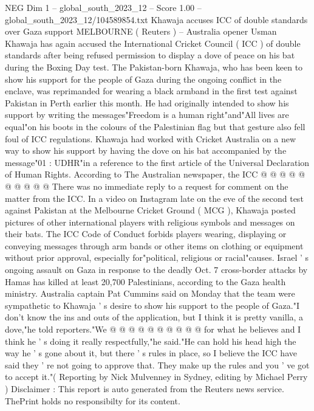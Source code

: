 \begin{textsample}{NEG Dim 1 – global\_south\_2023\_12 – Score 1.00 – global\_south\_2023\_12/104589854.txt}  \label{ex:f1_neg_295}
Khawaja accuses ICC of double standards over Gaza support MELBOURNE ( Reuters ) -- Australia opener Usman Khawaja has again accused the International Cricket Council ( ICC ) of double standards after being refused permission to display a dove of peace on his bat during the Boxing Day test.
The Pakistan-born Khawaja, who has been keen to show his support for the people of Gaza during the ongoing conflict in the enclave, was reprimanded for wearing a black armband in the first test against Pakistan in Perth earlier this month.
He had originally intended to show his support by writing the messages"Freedom is a human right"and"All lives are equal"on his boots in the colours of the Palestinian flag but that gesture also fell foul of ICC regulations.
Khawaja had worked with Cricket Australia on a new way to show his support by having the dove on his bat accompanied by the message"01 : UDHR"in a reference to the first article of the Universal Declaration of Human Rights.
According to The Australian newspaper, the ICC @ @ @ @ @ @ @ @ @ @ There was no immediate reply to a request for comment on the matter from the ICC.
In a video on Instagram late on the eve of the second test against Pakistan at the Melbourne Cricket Ground ( MCG ), Khawaja posted pictures of other international players with religious symbols and messages on their bats.
The ICC Code of Conduct forbids players wearing, displaying or conveying messages through arm bands or other items on clothing or equipment without prior approval, especially for"political, religious or racial"causes.
Israel ' s ongoing assault on Gaza in response to the deadly Oct. 7 cross-border attacks by Hamas has killed at least 20,700 Palestinians, according to the Gaza health ministry.
Australia captain Pat Cummins said on Monday that the team were sympathetic to Khawaja ' s desire to show his support to the people of Gaza."I don't know the ins and outs of the application, but I think it is pretty vanilla, a dove,"he told reporters."We @ @ @ @ @ @ @ @ @ @ for what he believes and I think he ' s doing it really respectfully,"he said."He can hold his head high the way he ' s gone about it, but there ' s rules in place, so I believe the ICC have said they ' re not going to approve that.
They make up the rules and you ' ve got to accept it."( Reporting by Nick Mulvenney in Sydney, editing by Michael Perry ) Disclaimer : This report is auto generated from the Reuters news service.
ThePrint holds no responsibilty for its content.

\end{textsample}
